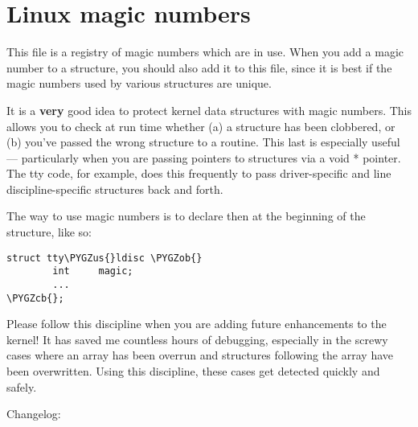 \documentclass[a4paper,8pt,english]{sphinxmanual}
\def\PYGZus{\char`\_}
\def\PYGZob{\char`\{}
\def\PYGZcb{\char`\}}
\begin{document}
\chapter{Linux magic numbers}
\label{process/magic-number::doc}\label{process/magic-number:linux-magic-numbers}
This file is a registry of magic numbers which are in use.  When you
add a magic number to a structure, you should also add it to this
file, since it is best if the magic numbers used by various structures
are unique.

It is a \textbf{very} good idea to protect kernel data structures with magic
numbers.  This allows you to check at run time whether (a) a structure
has been clobbered, or (b) you've passed the wrong structure to a
routine.  This last is especially useful --- particularly when you are
passing pointers to structures via a void * pointer.  The tty code,
for example, does this frequently to pass driver-specific and line
discipline-specific structures back and forth.

The way to use magic numbers is to declare then at the beginning of
the structure, like so:

\begin{Verbatim}[commandchars=\\\{\}]
struct tty\PYGZus{}ldisc \PYGZob{}
        int     magic;
        ...
\PYGZcb{};
\end{Verbatim}

Please follow this discipline when you are adding future enhancements
to the kernel!  It has saved me countless hours of debugging,
especially in the screwy cases where an array has been overrun and
structures following the array have been overwritten.  Using this
discipline, these cases get detected quickly and safely.

Changelog:
\end{document}
